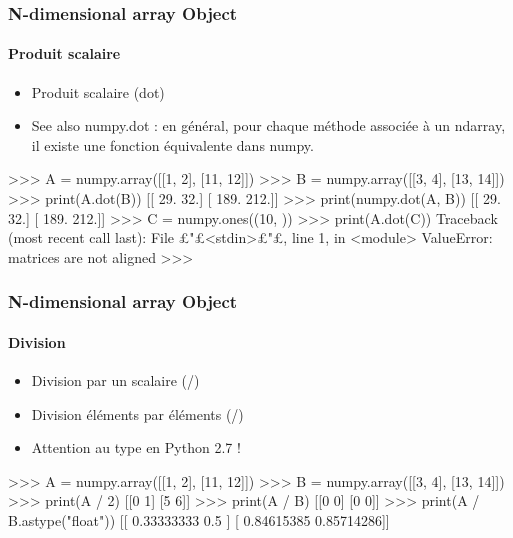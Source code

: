 \begin{frame}[fragile]
\frametitle{N-dimensional array Object}
\framesubtitle{Produit scalaire}
\begin{itemize}
 \item Produit scalaire (dot)
 \item See also numpy.dot : en général, pour chaque méthode associée à un ndarray, il existe une fonction équivalente dans numpy. 
\end{itemize}
\begin{pythonConsole}
>>> A = numpy.array([[1, 2], [11, 12]])
>>> B = numpy.array([[3, 4], [13, 14]])
>>> print(A.dot(B))
[[  29.   32.]
 [ 189.  212.]]
>>> print(numpy.dot(A, B))
[[  29.   32.]
 [ 189.  212.]]
>>> C = numpy.ones((10, ))
>>> print(A.dot(C))
Traceback (most recent call last):
  File £"£<stdin>£"£, line 1, in <module>
ValueError: matrices are not aligned
>>> 
\end{pythonConsole}
\end{frame}
\begin{frame}[fragile]
\frametitle{N-dimensional array Object}
\framesubtitle{Division}
\begin{itemize}
 \item Division par un scalaire (/)
 \item Division éléments par éléments (/) 
 \item Attention au type en Python 2.7 ! 
\end{itemize}
\begin{pythonConsole}
>>> A = numpy.array([[1, 2], [11, 12]])
>>> B = numpy.array([[3, 4], [13, 14]])
>>> print(A / 2)
[[0 1]
 [5 6]]
>>> print(A / B)
[[0 0]
 [0 0]]
>>> print(A / B.astype("float"))
[[ 0.33333333  0.5       ]
 [ 0.84615385  0.85714286]]
\end{pythonConsole}
\end{frame}

